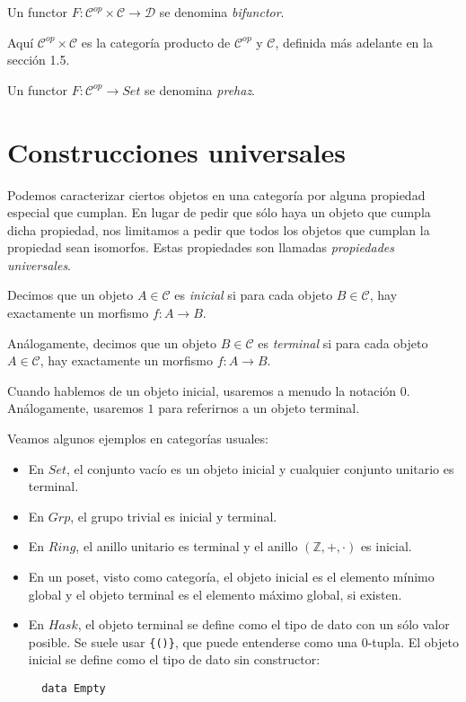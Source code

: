 \documentclass[12pt, twoside]{book}
\newcommand{\newterm}[1]{\index{#1}\emph{#1}}
\newcommand{\code}[1]{\Verb+{#1}+}
\newcommand{\cat}{{\mathcal{C}}}
\newcommand{\Set}{{Set}}
\newcommand{\Grp}{{Grp}}
\newcommand{\Ring}{{Ring}}
\newcommand{\Z}{{\mathbb{Z}}}
\newcommand{\Hask}{{Hask}}
\begin{document}
\begin{definition}
Un functor $F \colon \cat^{op} \times \cat \to \mathcal{D}$ se denomina \newterm{bifunctor}.
\end{definition}
Aquí $\cat^{op} \times \cat$ es la categoría producto de $\cat^{op}$ y $\cat$, definida más adelante en la sección 1.5.

\begin{definition}
Un functor $F \colon \cat^{op} \to \Set$ se denomina \newterm{prehaz}.
\end{definition}

\section{Construcciones universales}
Podemos caracterizar ciertos objetos en una categoría por alguna propiedad especial que cumplan. En lugar de pedir que sólo haya un objeto que cumpla dicha propiedad, nos limitamos a pedir que todos los objetos que cumplan la propiedad sean isomorfos. Estas propiedades son llamadas \emph{propiedades universales}.

\begin{definition}
Decimos que un objeto $A \in \cat$ es \newterm{inicial} si para cada objeto $B \in \cat$, hay exactamente un morfismo $f \colon A \to B$.

Análogamente, decimos que un objeto $B \in \cat$ es \newterm{terminal} si para cada objeto $A \in \cat$, hay exactamente un morfismo $f \colon A \to B$.
\end{definition}

Cuando hablemos de un objeto inicial, usaremos a menudo la notación $0$.
Análogamente, usaremos $1$ para referirnos a un objeto terminal.

\begin{example}
Veamos algunos ejemplos en categorías usuales:
\begin{itemize}
  \item En $\Set$, el conjunto vacío es un objeto inicial y cualquier conjunto unitario es terminal.
  \item En $\Grp$, el grupo trivial es inicial y terminal.
  \item En $\Ring$, el anillo unitario es terminal y el anillo $(\Z,+,\cdot)$ es inicial.
  \item En un poset, visto como categoría, el objeto inicial es el elemento mínimo global y el objeto terminal es el elemento máximo global, si existen.
  \item En $\Hask$, el objeto terminal se define como el tipo de dato con un sólo valor posible.
  Se suele usar \code{()}, que puede entenderse como una $0$-tupla.
  El objeto inicial se define como el tipo de dato sin constructor:
  \begin{verbatim}
  data Empty
  \end{verbatim}
\end{itemize}
\end{example}
\end{document}
